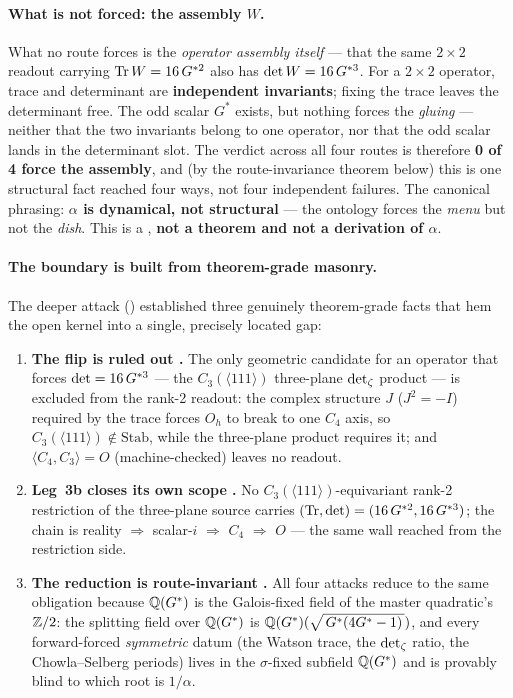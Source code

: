 \paragraph{What is not forced: the assembly $W$.} What no route forces
 is the \emph{operator assembly itself} --- that the same
$2\times2$ readout carrying $\operatorname{Tr} W=16\,G^{*2}$ also has $\det W=16\,G^{*3}$. For a
$2\times2$ operator, trace and determinant are \textbf{independent invariants};
fixing the trace leaves the determinant free. The odd scalar $G^{*}$ exists,
but nothing forces the \emph{gluing} --- neither that the two invariants belong
to one operator, nor that the odd scalar lands in the determinant slot. The
verdict across all four routes is therefore \textbf{0 of 4 force the assembly},
and (by the route-invariance theorem below) this is one structural fact reached
four ways, not four independent failures. The canonical phrasing:
\textbf{$\alpha$ is dynamical, not structural} --- the ontology forces the
\emph{menu} but not the \emph{dish}. This is a , \textbf{not a
theorem and not a derivation of $\alpha$}.

\paragraph{The boundary is built from theorem-grade masonry.} The deeper attack
() established three genuinely theorem-grade facts that hem the
open kernel into a single, precisely located gap:
\begin{enumerate}[leftmargin=1.6em, itemsep=2pt]
  \item \textbf{The flip is ruled out .} The only geometric candidate
    for an operator that forces $\det=16\,G^{*3}$ --- the $C_3(\langle111\rangle)$
    three-plane $\operatorname{det}\nolimits_{\zeta}$ product --- is excluded from the rank-2 readout: the
    complex structure $J$ ($J^{2}=-I$) required by the trace forces $O_h$ to
    break to one $C_4$ axis, so $C_3(\langle111\rangle)\notin\mathrm{Stab}$,
    while the three-plane product requires it; and $\langle C_4,C_3\rangle=O$
    (machine-checked) leaves no readout.
  \item \textbf{Leg~3b closes its own scope .} No
    $C_3(\langle111\rangle)$-equivariant rank-2 restriction of the three-plane
    source carries $(\operatorname{Tr},\operatorname{det})=(16\,G^{*2},16\,G^{*3})$; the chain is
    reality $\Rightarrow$ scalar-$i$ $\Rightarrow$ $C_4$ $\Rightarrow$ $O$ ---
    the same wall reached from the restriction side.
  \item \textbf{The reduction is route-invariant .} All four attacks
    reduce to the same obligation because $\mathbb{Q}(G^{*})$ is the Galois-fixed field
    of the master quadratic's $\mathbb{Z}/2$: the splitting field over $\mathbb{Q}(G^{*})$ is
    $\mathbb{Q}(G^{*})(\sqrt{\,G^{*}(4G^{*} - 1)\,})$, and every forward-forced \emph{symmetric} datum
    (the Watson trace, the $\operatorname{det}\nolimits_{\zeta}$ ratio, the Chowla--Selberg periods) lives in
    the $\sigma$-fixed subfield $\mathbb{Q}(G^{*})$ and is provably blind to which root
    is $1/\alpha$.
\end{enumerate}

